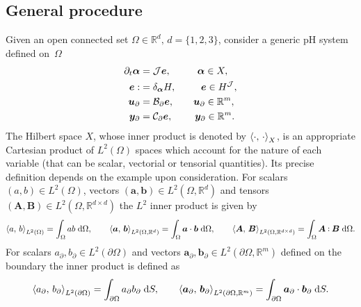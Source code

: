 \subsection{General procedure}\label{sec:pfem_gen}
Given an open connected set $\Omega \in \mathbb{R}^d,\, d= \{1,2,3\}$, consider a generic pH system defined on~$\Omega$
\begin{subequations}
\label{eq:pHsys_2}
\begin{align}
\partial_t {\bm{\alpha}} &= \mathcal{J}\displaystyle \bm{e}, \qquad \;\;\, \bm{\alpha} \in X, \label{eq:pHsys_dyn} \vspace{3pt}\\
\bm{e} :&= \displaystyle \delta_{\bm{\alpha}}H, \qquad \;\; \bm{e} \in H^\mathcal{J}, \label{eq:pHsys_const} \\
\bm{u}_\partial &= \mathcal{B}_\partial  \displaystyle \bm{e}, \qquad \bm{u}_\partial \in \mathbb{R}^m, \label{eq:pHsys_u} \vspace{3pt}\\
\bm{y}_\partial &= \mathcal{C}_\partial \displaystyle \bm{e}, \qquad \; \bm{y}_\partial \in \mathbb{R}^m. \label{eq:pHsys_y} \vspace{3pt}
\end{align}
\end{subequations}
The Hilbert space $X$, whose inner product is denoted by $\inner[X]{\cdot}{\cdot}$, is an appropriate Cartesian product of $L^2(\Omega)$ spaces which account for the nature of each variable (that can be scalar, vectorial or tensorial quantities). Its precise definition depends on the example upon consideration. For scalars $(a,b) \in L^2(\Omega)$, vectors $(\bm{a}, \bm{b})\in L^2(\Omega, \mathbb{R}^d)$ and tensors  $(\bm{A}, \bm{B}) \in L^2(\Omega,\mathbb{R}^{d\times d})$ the $L^2$ inner product is given by 
\begin{equation}
\inner[L^2(\Omega)]{a}{b} = \int_{\Omega} a b \d\Omega, \qquad \inner[L^2(\Omega, \mathbb{R}^d)]{\bm{a}}{\bm{b}} = \int_{\Omega} \bm{a} \cdot \bm{b} \d\Omega, \qquad \inner[L^2(\Omega, \mathbb{R}^{d \times d})]{\bm{A}}{\bm{B}} = \int_{\Omega} \bm{A} \cddot \bm{B} \d\Omega.
\end{equation} 
For scalars ${a}_\partial, {b}_\partial \in L^2(\partial\Omega)$ and vectors  $\bm{a}_\partial, \bm{b}_\partial \in L^2(\partial\Omega, \mathbb{R}^m)$ defined on the boundary the inner product is defined as
\begin{equation}
\inner[L^2(\partial\Omega)]{a_\partial}{b_\partial} = \int_{\partial\Omega} a_\partial b_\partial \d{S}, \qquad \inner[L^2(\partial\Omega, \mathbb{R}^m)]{\bm{a}_\partial}{\bm{b}_\partial} = \int_{\partial\Omega} \bm{a}_\partial \cdot \bm{b}_\partial \d{S}.
\end{equation} 
